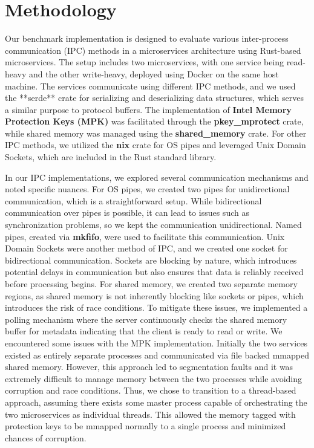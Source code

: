\documentclass[letterpaper,twocolumn,10pt]{article}
\begin{document}
\section{Methodology}
Our benchmark implementation is designed to evaluate various inter-process communication (IPC) methods in a microservices architecture using Rust-based microservices.
The setup includes two microservices, with one service being read-heavy and the other write-heavy, deployed using Docker on the same host machine.
The services communicate using different IPC methods, and we used the **serde** crate for serializing and deserializing data structures, which serves a similar purpose to protocol buffers.
The implementation of \textbf{Intel Memory Protection Keys (MPK)} was facilitated through the \textbf{pkey\_mprotect} crate, while shared memory was managed using the \textbf{shared\_memory} crate.
For other IPC methods, we utilized the \textbf{nix} crate for OS pipes and leveraged Unix Domain Sockets, which are included in the Rust standard library.

In our IPC implementations, we explored several communication mechanisms and noted specific nuances.
For OS pipes, we created two pipes for unidirectional communication, which is a straightforward setup.
While bidirectional communication over pipes is possible, it can lead to issues such as synchronization problems, so we kept the communication unidirectional.
Named pipes, created via \textbf{mkfifo}, were used to facilitate this communication.
Unix Domain Sockets were another method of IPC, and we created one socket for bidirectional communication.
Sockets are blocking by nature, which introduces potential delays in communication but also ensures that data is reliably received before processing begins.
For shared memory, we created two separate memory regions, as shared memory is not inherently blocking like sockets or pipes, which introduces the risk of race conditions.
To mitigate these issues, we implemented a polling mechanism where the server continuously checks the shared memory buffer for metadata indicating that the client is ready to read or write.  
We encountered some issues with the MPK implementation. Initially the two services existed as entirely separate processes and communicated via file backed mmapped shared memory.  However, this approach led to segmentation faults and it was extremely difficult to manage memory between the two processes while avoiding corruption and race conditions. Thus, we chose to transition to a thread-based approach, assuming there exists some master process capable of orchestrating the two microservices as individual threads.  This allowed the memory tagged with protection keys to be mmapped normally to a single process and minimized chances of corruption.
\end{document}
